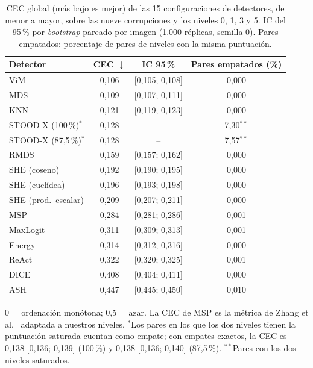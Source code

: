 \begin{table}
\centering
\footnotesize
\setlength{\tabcolsep}{4pt}
\caption{CEC global (más bajo es mejor) de las 15 configuraciones de detectores, de menor a mayor, sobre las nueve corrupciones y los niveles 0, 1, 3 y 5. IC del 95\,\% por \emph{bootstrap} pareado por imagen (1.000 réplicas, semilla 0). Pares empatados: porcentaje de pares de niveles con la misma puntuación.}
\label{tab:ood-corr-cec}
\begin{tabular*}{\linewidth}{@{\extracolsep{\fill}}lccc}
\toprule
Detector & CEC $\downarrow$ & IC 95\,\% & Pares empatados (\%) \\
\midrule
ViM & 0{,}106 & [0{,}105; 0{,}108] & 0{,}000 \\
MDS & 0{,}109 & [0{,}107; 0{,}111] & 0{,}000 \\
KNN & 0{,}121 & [0{,}119; 0{,}123] & 0{,}000 \\
STOOD-X (100\,\%)$^{\ast}$ & 0{,}128 & -- & 7{,}30$^{\ast\ast}$ \\
STOOD-X (87,5\,\%)$^{\ast}$ & 0{,}128 & -- & 7{,}57$^{\ast\ast}$ \\
RMDS & 0{,}159 & [0{,}157; 0{,}162] & 0{,}000 \\
SHE (coseno) & 0{,}192 & [0{,}190; 0{,}195] & 0{,}000 \\
SHE (euclídea) & 0{,}196 & [0{,}193; 0{,}198] & 0{,}000 \\
SHE (prod.\ escalar) & 0{,}209 & [0{,}207; 0{,}211] & 0{,}000 \\
MSP & 0{,}284 & [0{,}281; 0{,}286] & 0{,}001 \\
MaxLogit & 0{,}311 & [0{,}309; 0{,}313] & 0{,}001 \\
Energy & 0{,}314 & [0{,}312; 0{,}316] & 0{,}000 \\
ReAct & 0{,}322 & [0{,}320; 0{,}325] & 0{,}001 \\
DICE & 0{,}408 & [0{,}404; 0{,}411] & 0{,}000 \\
ASH & 0{,}447 & [0{,}445; 0{,}450] & 0{,}010 \\
\bottomrule
\end{tabular*}

\smallskip
\parbox{\linewidth}{\scriptsize 0 = ordenación monótona; 0,5 = azar. La CEC de MSP es la métrica de Zhang et al.~\cite{zhang2022corruptions} adaptada a nuestros niveles. $^{\ast}$Los pares en los que los dos niveles tienen la puntuación saturada cuentan como empate; con empates exactos, la CEC es 0{,}138 [0{,}136; 0{,}139] (100\,\%) y 0{,}138 [0{,}136; 0{,}140] (87,5\,\%). $^{\ast\ast}$Pares con los dos niveles saturados.}
\end{table}
